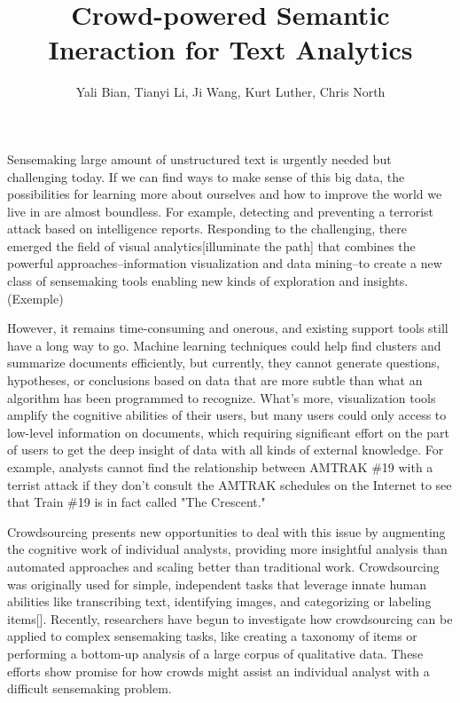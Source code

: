 \documentclass[journal]{vgtc}                %
\title{Crowd-powered Semantic Ineraction for Text Analytics}
\author{Yali Bian, Tianyi Li, Ji Wang, Kurt Luther, Chris North}
\begin{document}
\maketitle
Sensemaking large amount of unstructured text is urgently needed but challenging today. If we can find ways to make sense of this big data, the possibilities for learning more about ourselves and how to improve the world we live in are almost boundless. For example, detecting and preventing a terrorist attack based on intelligence reports. Responding to the challenging, there emerged the field of visual analytics[illuminate the path] that combines the powerful approaches--information visualization and data mining--to create a new class of sensemaking tools enabling new kinds of exploration and insights. (Exemple)

However, it remains time-consuming and onerous, and existing support tools still have a long way to go. Machine learning techniques could help find clusters and summarize documents efficiently, but currently, they cannot generate questions, hypotheses, or conclusions based on data that are more subtle than what an algorithm has been programmed to recognize. What's more, visualization tools amplify the cognitive abilities of their users, but many users could only access to low-level information on documents, which requiring significant effort on the part of users to get the deep insight of data with all kinds of external knowledge. For example, analysts cannot find the relationship between AMTRAK \#19 with a terrist attack if they don't consult the AMTRAK schedules on the Internet to see that Train \#19 is in fact called "The Crescent."


Crowdsourcing presents new opportunities to deal with this issue by augmenting the cognitive work of individual analysts, providing more insightful analysis than automated approaches and scaling better than traditional work. Crowdsourcing was originally used for simple, independent tasks that leverage innate human abilities like transcribing text, identifying images, and categorizing or labeling items[]. Recently, researchers have begun to investigate how crowdsourcing can be applied to complex sensemaking tasks, like creating a taxonomy of items or performing a bottom-up analysis of a large corpus of qualitative data. These efforts show promise for how crowds might assist an individual analyst with a difficult sensemaking problem.
\end{document}

